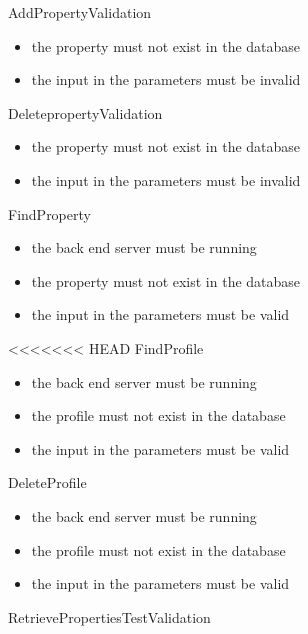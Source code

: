 \documentclass[a4paper,12pt]{article}
\begin{document}
AddPropertyValidation
\begin{itemize}
 \item the property must not exist in the database
 \item the input in the parameters must be invalid
\end{itemize}
DeletepropertyValidation
\begin{itemize}
 \item the property must not exist in the database
 \item the input in the parameters must be invalid
\end{itemize}
FindProperty
\begin{itemize}
 \item the back end server must be running
 \item the property must not exist in the database
 \item the input in the parameters must be valid
\end{itemize}
<<<<<<< HEAD
FindProfile
\begin{itemize}
 \item the back end server must be running
 \item the profile must not exist in the database
 \item the input in the parameters must be valid
\end{itemize}
DeleteProfile
\begin{itemize}
 \item the back end server must be running
 \item the profile must not exist in the database
 \item the input in the parameters must be valid
\end{itemize}
RetrievePropertiesTestValidation
\end{document}
